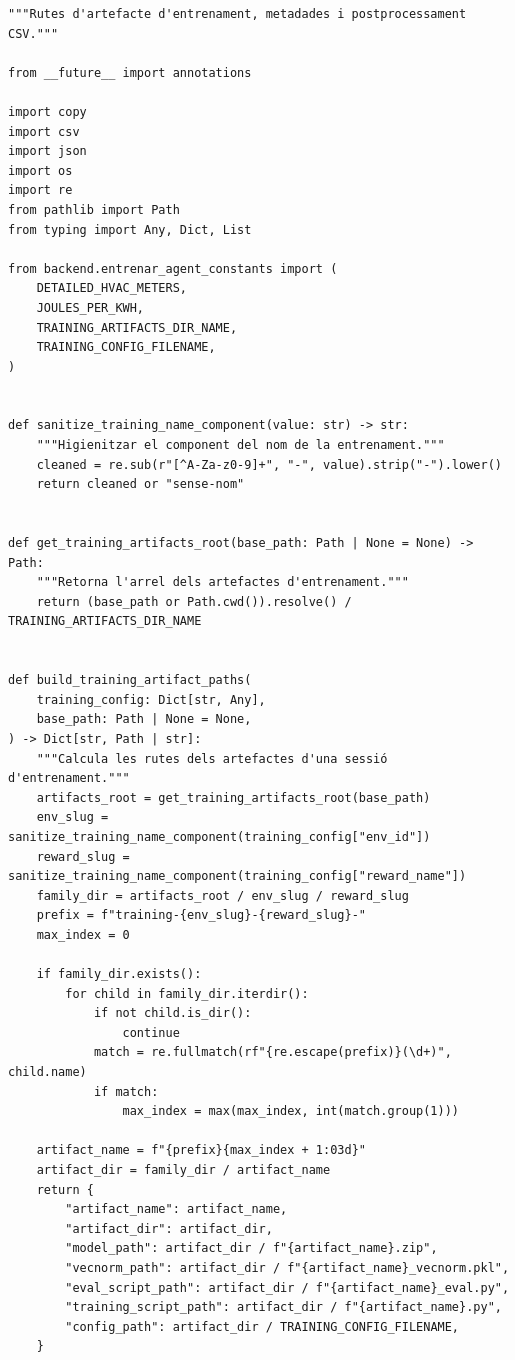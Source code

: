 \documentclass[10pt,a4paper]{article}
\begin{document}
\begin{lstlisting}[style=studioPython,caption={backend/entrenar\_agent\_artifacts.py},label={lst:backend-entrenar-agent-artifacts-py}]
"""Rutes d'artefacte d'entrenament, metadades i postprocessament CSV."""

from __future__ import annotations

import copy
import csv
import json
import os
import re
from pathlib import Path
from typing import Any, Dict, List

from backend.entrenar_agent_constants import (
    DETAILED_HVAC_METERS,
    JOULES_PER_KWH,
    TRAINING_ARTIFACTS_DIR_NAME,
    TRAINING_CONFIG_FILENAME,
)


def sanitize_training_name_component(value: str) -> str:
    """Higienitzar el component del nom de la entrenament."""
    cleaned = re.sub(r"[^A-Za-z0-9]+", "-", value).strip("-").lower()
    return cleaned or "sense-nom"


def get_training_artifacts_root(base_path: Path | None = None) -> Path:
    """Retorna l'arrel dels artefactes d'entrenament."""
    return (base_path or Path.cwd()).resolve() / TRAINING_ARTIFACTS_DIR_NAME


def build_training_artifact_paths(
    training_config: Dict[str, Any],
    base_path: Path | None = None,
) -> Dict[str, Path | str]:
    """Calcula les rutes dels artefactes d'una sessió d'entrenament."""
    artifacts_root = get_training_artifacts_root(base_path)
    env_slug = sanitize_training_name_component(training_config["env_id"])
    reward_slug = sanitize_training_name_component(training_config["reward_name"])
    family_dir = artifacts_root / env_slug / reward_slug
    prefix = f"training-{env_slug}-{reward_slug}-"
    max_index = 0

    if family_dir.exists():
        for child in family_dir.iterdir():
            if not child.is_dir():
                continue
            match = re.fullmatch(rf"{re.escape(prefix)}(\d+)", child.name)
            if match:
                max_index = max(max_index, int(match.group(1)))

    artifact_name = f"{prefix}{max_index + 1:03d}"
    artifact_dir = family_dir / artifact_name
    return {
        "artifact_name": artifact_name,
        "artifact_dir": artifact_dir,
        "model_path": artifact_dir / f"{artifact_name}.zip",
        "vecnorm_path": artifact_dir / f"{artifact_name}_vecnorm.pkl",
        "eval_script_path": artifact_dir / f"{artifact_name}_eval.py",
        "training_script_path": artifact_dir / f"{artifact_name}.py",
        "config_path": artifact_dir / TRAINING_CONFIG_FILENAME,
    }



\end{lstlisting}
\end{document}
